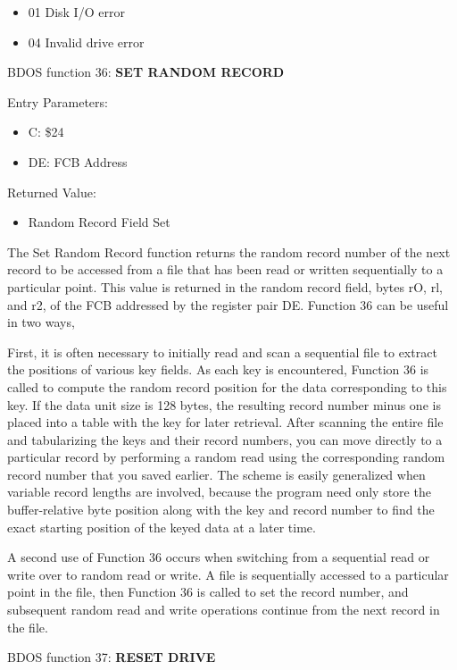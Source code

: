 \begin{itemize}
\item 01 Disk I/O error
\item 04 Invalid drive error
\end{itemize}

BDOS function 36: \textbf{SET RANDOM RECORD}

Entry Parameters:
\begin{itemize}
\item[] C: \$24
\item[] DE: FCB Address
\end{itemize}

Returned Value:
\begin{itemize}
\item[] Random Record Field Set
\end{itemize} 

The Set Random Record function returns the random record number of the
next record to be accessed from a file that has been read or written
sequentially to a particular point. This value is returned in the
random record field, bytes rO, rl, and r2, of the FCB addressed by the
register pair DE. Function 36 can be useful in two ways,

First, it is often necessary to initially read and scan a sequential
file to extract the positions of various key fields. As each key is
encountered, Function 36 is called to compute the random record
position for the data corresponding to this key. If the data unit size
is 128 bytes, the resulting record number minus one is placed into a
table with the key for later retrieval. After scanning the entire file
and tabularizing the keys and their record numbers, you can move
directly to a particular record by performing a random read using the
corresponding random record number that you saved earlier. The scheme
is easily generalized when variable record lengths are involved,
because the program need only store the buffer-relative byte position
along with the key and record number to find the exact starting
position of the keyed data at a later time.

A second use of Function 36 occurs when switching from a sequential
read or write over to random read or write. A file is sequentially
accessed to a particular point in the file, then Function 36 is called
to set the record number, and subsequent random read and write
operations continue from the next record in the file.

BDOS function 37: \textbf{RESET DRIVE}

